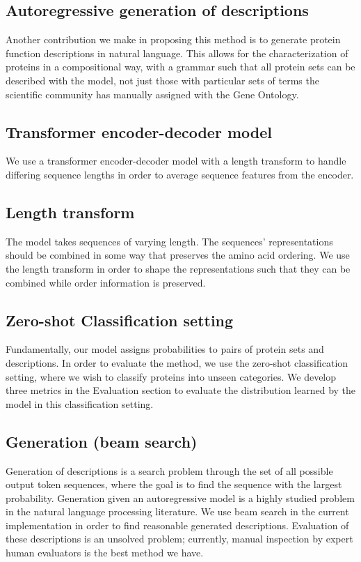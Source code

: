 \documentclass{article}
\begin{document}
    \subsection{Autoregressive generation of descriptions}
    Another contribution we make in proposing this method is to generate protein function descriptions in natural language. This allows for the characterization of proteins in a compositional way, with a grammar such that all protein sets can be described with the model, not just those with particular sets of terms the scientific community has manually assigned with the Gene Ontology.
    \subsection{Transformer encoder-decoder model}
    We use a transformer encoder-decoder model \citet{vaswani2017attention} with a length transform \cite{shu2020latent} to handle differing sequence lengths in order to average sequence features from the encoder.
    \subsection{Length transform}
    The model takes sequences of varying length. The sequences' representations should be combined in some way that preserves the amino acid ordering. We use the length transform in order to shape the representations such that they can be combined while order information is preserved.
    \subsection{Zero-shot Classification setting}
    Fundamentally, our model assigns probabilities to pairs of protein sets and descriptions. In order to evaluate the method, we use the zero-shot classification setting, where we wish to classify proteins into unseen categories. We develop three metrics in the Evaluation section to evaluate the distribution learned by the model in this classification setting.

    \subsection{Generation (beam search)}
    Generation of descriptions is a search problem through the set of all possible output token sequences, where the goal is to find the sequence with the largest probability. Generation given an autoregressive model is a highly studied problem in the natural language processing literature.%
    We use beam search in the current implementation in order to find reasonable generated descriptions. Evaluation of these descriptions is an unsolved problem; currently, manual inspection by expert human evaluators is the best method we have.
\end{document}
